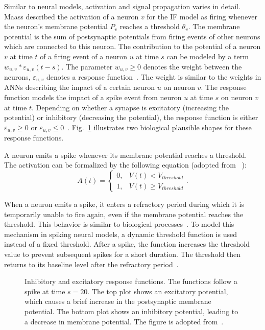 Similar to neural models, activation and signal propagation varies in detail.
Maass described the activation of a neuron \(v\) for the \ac{IF} model as firing whenever the neuron's membrane potential \(P_v\) reaches a threshold \(\theta_v\).
The membrane potential is the sum of postsynaptic potentials from firing events of other neurons which are connected to this neuron.
The contribution to the potential of a neuron \(v\) at time \(t\) of a firing event of a neuron \(u\) at time \(s\) can be modeled by a term \(w_{u,v}*\varepsilon_{u,v}(t-s)\).
The parameter \(w_{u,v} \ge 0\) denotes the weight between the neurons, \(\varepsilon_{u,v}\) denotes a response function~\cite{maass_networks_1997}.
The weight is similar to the weights in \acp{ANN} describing the impact of a certain neuron \(u\) on neuron \(v\). 
The response function models the impact of a spike event from neuron \(u\) at time \(s\) on neuron \(v\) at time \(t\).
Depending on whether a synapse is excitatory (increasing the potential) or inhibitory (decreasing the potential), the response function is either \(\varepsilon_{u,v}\ge0\) or \(\varepsilon_{u,v}\le0\)~\cite{maass_networks_1997}.
Fig.~\ref{fig:responsefunctions} illustrates two biological plausible shapes for these response functions.

A neuron emits a spike whenever its membrane potential reaches a threshold.
The activation can be formalized by the following equation (adopted from ~\cite{nunes_spiking_2022}):
\begin{equation}
    A(t)= \begin{cases}
        0, & V(t) <  V_{threshold} \\
        1, & V(t) \ge  V_{threshold}
    \end{cases}.
\end{equation}

When a neuron emits a spike, it enters a refractory period during which it is temporarily unable to fire again, even if the membrane potential reaches the threshold.
This behavior is similar to biological processes~\cite{maass_networks_1997, nunes_spiking_2022}.
To model this mechanism in spiking neural models, a dynamic threshold function is used instead of a fixed threshold.
After a spike, the function increases the threshold value to prevent subsequent spikes for a short duration.
The threshold then returns to its baseline level after the refractory period~\cite{maass_networks_1997}.


\begin{figure}
    \centering
    
    \caption[Inhibitory and excitatory response functions.]{Inhibitory and excitatory response functions.
    The functions follow a spike at time \(s=20\).
    The top plot shows an excitatory potential, which causes a brief increase in the postsynaptic membrane potential.
    The bottom plot shows an inhibitory potential, leading to a decrease in membrane potential. 
    The figure is adopted from~\cite{maass_networks_1997}.}
    \label{fig:responsefunctions}
\end{figure}



